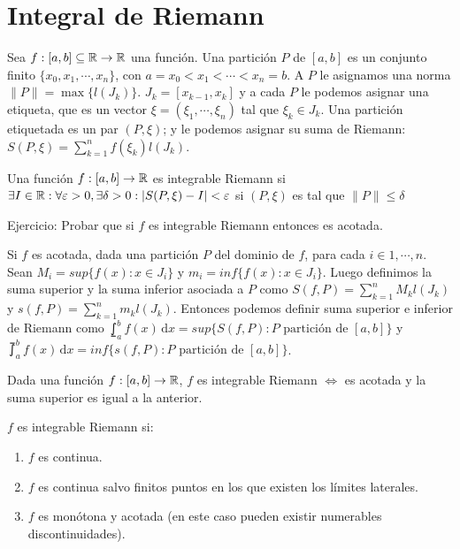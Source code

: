 \section{Integral de Riemann}

Sea $f: [a, b] \subseteq \mathbb{R} \to \mathbb{R}$ una función.
Una partición $P$ de $[a, b]$ es un conjunto finito $\{ x_0, x_1, \cdots, x_n \}$, con
$a = x_0 < x_1 < \cdots < x_n = b$. A $P$ le asignamos una norma $\| P \| = \max \{ l(J_k) \}$. $J_k = [x_{k-1}, x_k]$ y a cada $P$ le
podemos asignar una etiqueta, que es un vector $\xi = (\xi_1, \cdots, \xi_n)$ tal que $\xi_k \in J_k$. Una partición etiquetada es un par
$(P, \xi)$; y le podemos asignar su suma de Riemann: $S(P, \xi) = \sum_{k=1}^{n} f(\xi_k) l(J_k)$.

\begin{definition}
    Una función $f: [a, b] \to \mathbb{R}$ es integrable Riemann si $\exists I \in \mathbb{R} : \forall \varepsilon > 0, \exists \delta > 0 : | S(P, \xi) - I | < \varepsilon$ si $(P, \xi)$ es tal que $\| P \| \leq \delta$
\end{definition}

Ejercicio: Probar que si $f$ es integrable Riemann entonces es acotada.

Si $f$ es acotada, dada una partición $P$ del dominio de $f$, para cada $i \in 1, \cdots, n$. Sean $M_i = sup \{ f(x) : x \in J_i \}$ y
$m_i = inf\{ f(x) : x \in J_i \}$. Luego definimos la suma superior y la suma inferior asociada a $P$ como $S(f, P) = \sum_{k=1}^{n} M_k l(J_k)$ y
$s(f, P) = \sum_{k=1}^{n} m_k l(J_k)$. Entonces podemos definir suma superior e inferior de Riemann como
$\lowint_a^b f(x) \, \mathrm{d}x = sup \{ S(f, P) : P \text{ partición de } [a, b] \}$ y
$\upint_a^b f(x) \, \mathrm{d}x = inf \{ s(f, P) : P \text{ partición de } [a, b] \}$.

\begin{prop}
    Dada una función $f: [a, b] \to \mathbb{R}$, $f$ es integrable Riemann $\iff$ es acotada y la suma superior es igual a la anterior.
\end{prop}

\begin{note}
    $f$ es integrable Riemann si: \begin{enumerate}
        \item $f$ es continua.
        \item $f$ es continua salvo finitos puntos en los que existen los límites laterales.
        \item $f$ es monótona y acotada (en este caso pueden existir numerables discontinuidades).
    \end{enumerate}
\end{note}

